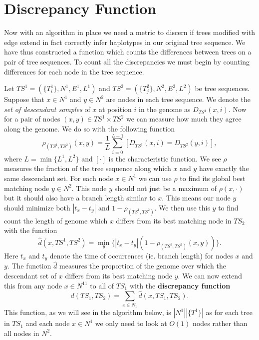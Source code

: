 \documentclass[10pt,twoside,lineno]{gsajnl}
\begin{document}
\section{Discrepancy Function}

\par Now with an algorithm in place
 we need a metric to discern
 if trees modified with edge extend
 in fact correctly infer haplotypes in our original tree sequence.
 We have thus constructed a function which counts the differences 
 between trees on a pair of tree sequences. 
 To count all the discrepancies we must begin by counting differences for each node in the tree sequence.
 
 Let $TS^1=(\{T_i^1\},N^1,E^1,L^1)$ and $TS^2=(\{T^2_j\},N^2,E^2,L^2)$ be tree sequences.
 Suppose that $x\in N^1$ and $y\in N^2$ are nodes in each tree sequence.
 We denote the \textit{set of descendant samples} of $x$ at position $i$ in the genome as $D_{TS^1}(x,i)$.
 Now for a pair of nodes $(x,y)\in TS^1\times TS^2$ 
 we can measure how much they agree along the genome.
 We do so with the following function
 $$\rho_{(TS^1,TS^2)}(x,y)=\frac{1}{L}\sum_{i=0}^{L-1}[D_{TS^1}(x,i)=D_{TS^2}(y,i)],$$
 where $L=\min\{L^1,L^2\}$ and $[\cdot]$ is the characteristic function. 
 We see $\rho$ measures the fraction of the tree sequence
 along which $x$ and $y$ have exactly the same descendant set. 
 For each node $x\in N^1$ we can use $\rho$ to find its global best matching node $y\in N^2$. 
 This node $y$ should not just be a maximum of $\rho(x,\cdot)$ but it should also have a branch length similar to $x$. 
 This means our node $y$ should minimize both $|t_x-t_y|$ and $1-\rho_{(TS^1,TS^2)}$.
 We then use this $y$ to find count the length of genome which $x$ differs from its best matching node in $TS_2$ with the function
 $$\hat{d}(x,TS^1,TS^2)=\min_y\{|t_x-t_y|(1-\rho_{(TS^1,TS^2)}(x,y))\}.$$
 Here $t_x$ and $t_y$ denote the time of occurrences (ie. branch length) for nodes $x$ and $y$. 
 The function $\hat{d}$ measures the proportion of the genome 
 over which the descendant set of $x$ differs from its best matching node $y$.
 We can now extend this from any node $x\in N^11$ to all of $TS_1$ with the \textbf{discrepancy function}
 $$d(TS_1,TS_2)=\sum_{x\in N_1}\hat{d}(x,TS_1,TS_2).$$
 This function, as we will see in the algorithm below,
 is $|N^1||\{T^1\}|$ as for each tree in $TS_1$ and each node $x\in N^1$ we only need to look at $O(1)$ nodes rather than all nodes in $N^2$.
 
\end{document}
